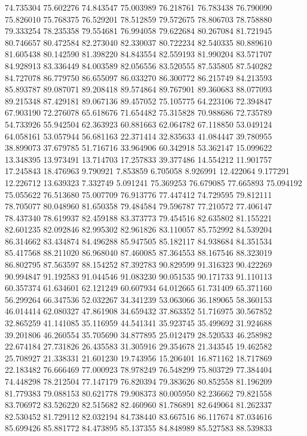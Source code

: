 74.735304
75.602276
74.843547
75.003989
76.218761
76.783438
76.790090
75.826010
75.768375
76.529201
78.512859
79.572675
78.806703
78.758880
79.333254
78.235358
79.554681
76.994058
79.622684
80.267084
81.721945
80.746657
80.472584
82.273040
82.330037
80.722234
82.540335
80.889610
81.605438
80.142590
81.398220
84.843554
82.559193
81.990204
83.571707
84.928913
83.336449
84.003589
82.056556
83.520555
87.535805
87.540282
84.727078
86.779750
86.655097
86.033270
86.300772
86.215749
84.213593
85.893787
89.087071
89.208418
89.574864
89.767901
89.360683
88.077093
89.215348
87.429181
89.067136
89.457052
75.105775
64.223106
72.394847
67.903190
72.276078
65.618676
71.654482
75.315828
70.988686
72.735789
54.733926
55.942504
62.363923
60.881663
62.064782
67.118850
53.049124
64.058161
53.057944
56.681163
22.371414
32.835633
41.084447
39.780955
38.899073
37.679785
51.716716
33.964906
60.342918
53.362147
15.099622
13.348395
13.973491
13.714703
17.257833
39.377486
14.554212
11.901757
17.245843
18.476963
9.790921
7.853859
6.705058
8.926991
12.422064
9.177291
12.226712
13.639323
7.332749
5.091241
75.369253
76.679085
77.665893
75.094192
75.055622
76.513680
75.007709
76.913776
77.447412
74.729595
79.812111
78.705077
80.048960
81.650358
79.484584
79.596787
77.210572
77.406147
78.437340
78.619937
82.459188
83.373773
79.454516
82.635802
81.155221
82.601235
82.092846
82.995302
82.961826
83.110057
85.752992
84.539204
86.314662
83.434874
84.496288
85.947505
85.182117
84.938684
84.351534
85.417568
88.211020
86.968040
87.460085
87.364553
88.167546
88.323019
86.802795
87.563597
88.154252
87.392783
90.829599
91.316323
90.422269
90.994847
91.192583
91.044546
91.083230
90.051535
90.171733
91.110113
60.357374
61.634601
62.121249
60.607934
64.012665
61.731409
65.371160
56.299264
66.347536
52.032267
34.341239
53.063066
36.189065
58.360153
46.014414
62.080327
47.861908
34.659432
37.863352
51.716975
30.567852
32.865259
41.141085
35.116959
44.541341
35.923745
35.499692
31.924688
39.201806
46.260554
35.705690
34.877895
25.012479
28.520533
46.258982
22.674184
27.731826
26.435583
31.305916
29.354678
21.343545
19.462582
25.708927
21.338331
21.601230
19.743956
15.206401
16.871162
18.717869
22.183482
76.666469
77.000923
78.978249
76.548299
75.803729
77.384404
74.448298
78.212504
77.147179
76.820394
79.383626
80.852558
81.196209
81.779383
79.088153
80.621778
79.908373
80.005950
82.236662
79.821558
83.706972
83.526220
82.515682
82.460960
81.786891
82.649064
81.262337
82.530452
81.729112
82.032194
84.738440
83.667516
86.117674
87.034616
85.699426
85.881772
84.473895
85.137355
84.848989
85.527583
88.539833
